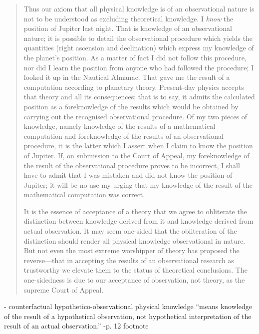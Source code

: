 \begin{quote}
    Thus our axiom that all physical knowledge is of an observational nature is not to be understood as excluding theoretical knowledge.  I \emph{know} the position of Jupiter last night.  That is knowledge of an observational nature; it is possible to detail the observational procedure which yields the quantities (right ascension and declination) which express my knowledge of the planet's position.  As a matter of fact I did not follow this procedure, nor did I learn the position from anyone who had followed the procedure; I looked it up in the Nautical Almanac.  That gave me the result of a computation according to planetary theory.  Present-day physics accepts that theory and all its consequences; that is to say, it admits the calculated position as a foreknowledge of the results which would be obtained by carrying out the recognised observational procedure.  Of my two pieces of knowledge, namely knowledge of the results of a mathematical computation and foreknowledge of the results of an observational procedure, it is the latter which I assert when I claim to know the position of Jupiter.  If, on submission to the Court of Appeal, my foreknowledge of the result of the observational procedure proves to be incorrect, I shall have to admit that I was mistaken and did not know the position of Jupiter; it will be no use my urging that my knowledge of the result of the mathematical computation was correct.
    
    It is the essence of acceptance of a theory that we agree to obliterate the distinction between knowledge derived from it and knowledge derived from actual observation.  It may seem one-sided that the obliteration of the distinction should render all physical knowledge observational in nature.  But not even the most extreme worshipper of theory has proposed the reverse---that in accepting the results of an observational research as trustworthy we elevate them to the status of theoretical conclusions.  The one-sidedness is due to our acceptance of observation, not theory, as the supreme Court of Appeal.
    
    \citep[p. 10-11]{Eddington1939}
\end{quote}

- counterfactual hypothetico-observational physical knowledge ``means knowledge of the result of a hypothetical observation, not hypothetical interpretation of the result of an actual observation.'' -p. 12 footnote

